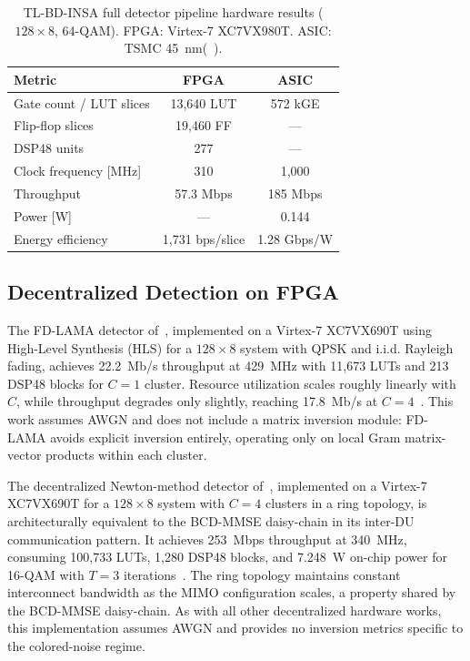 \documentclass[12pt]{article}
\begin{document}
\begin{table}[h]
\centering
\caption{TL-BD-INSA full detector pipeline hardware results
($128 \times 8$, 64-QAM). FPGA: Virtex-7 XC7VX980T.
ASIC: TSMC 45~nm(~\cite{wang2021tlbdinsa}).}
\label{tab:hw_cholesky}
\begin{tabular}{lcc}
\hline
\textbf{Metric} & \textbf{FPGA} & \textbf{ASIC} \\
\hline
Gate count / LUT slices     & 13,640 LUT  & 572 kGE       \\
Flip-flop slices            & 19,460 FF   & ---           \\
DSP48 units                 & 277         & ---           \\
Clock frequency [MHz]       & 310         & 1,000         \\
Throughput                  & 57.3 Mbps   & 185 Mbps      \\
Power [W]                   & ---         & 0.144         \\
Energy efficiency           & 1,731 bps/slice & 1.28 Gbps/W \\
\hline
\end{tabular}
\end{table}

\subsection{Decentralized Detection on FPGA}
The FD-LAMA detector of~\cite{li2019fdlama}, implemented on a
Virtex-7 XC7VX690T using High-Level Synthesis (HLS) for a $128 \times 8$
system with QPSK and i.i.d. Rayleigh fading, achieves 22.2~Mb/s
throughput at 429~MHz with 11,673 LUTs and 213 DSP48 blocks for
$C = 1$ cluster. Resource utilization scales roughly linearly with $C$,
while throughput degrades only slightly, reaching 17.8~Mb/s at
$C = 4$~\cite{li2019fdlama}. This work assumes AWGN and does not
include a matrix inversion module: FD-LAMA avoids explicit inversion
entirely, operating only on local Gram matrix-vector products within
each cluster.

The decentralized Newton-method detector of~\cite{kulkarni2021newton},
implemented on a Virtex-7 XC7VX690T for a $128 \times 8$ system with
$C = 4$ clusters in a ring topology, is architecturally equivalent to
the BCD-MMSE daisy-chain in its inter-DU communication pattern. It
achieves 253~Mbps throughput at 340~MHz, consuming 100,733 LUTs,
1,280 DSP48 blocks, and 7.248~W on-chip power for 16-QAM with
$T = 3$ iterations~\cite{kulkarni2021newton}. The ring topology
maintains constant interconnect bandwidth as the MIMO configuration
scales, a property shared by the BCD-MMSE daisy-chain. As with all
other decentralized hardware works, this implementation assumes AWGN
and provides no inversion metrics specific to the colored-noise regime.
\end{document}
